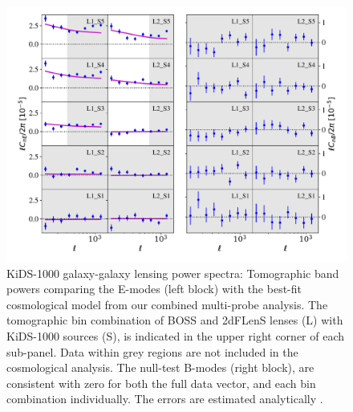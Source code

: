\begin{figure}
        \includegraphics[width=\textwidth]{Data_Plots/Pgk/Pgk_K1000_2Dbins_v2_goldclasses_Flag_SOM_Fid_A.pdf}
        \caption{KiDS-1000 galaxy-galaxy lensing power spectra:
          Tomographic band powers comparing the E-modes (left block)
          with the best-fit
          cosmological model from our combined multi-probe analysis.  The tomographic 
        bin combination of BOSS and 2dFLenS lenses (L) with KiDS-1000
        sources (S), is indicated in the upper right corner of each
        sub-panel.  Data within grey regions are not included in the cosmological analysis.
        The null-test B-modes (right block), are
      consistent with zero for both the full data vector, and each
     bin combination individually.  The errors are estimated analytically \citep{joachimi/etal:inprep}. }
        \label{fig:Pgk}
\end{figure}



